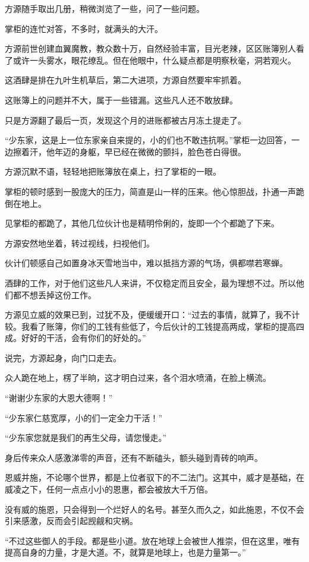 \begin{this_body}
方源随手取出几册，稍微浏览了一些，问了一些问题。

掌柜的连忙对答，不多时，就满头的大汗。

方源前世创建血翼魔教，教众数十万，自然经验丰富，目光老辣，区区账簿别人看了或许一头雾水，眼花缭乱。但在他眼中，什么疑点都是明察秋毫，洞若观火。

这酒肆是排在九叶生机草后，第二大进项，方源自然要牢牢抓着。

这账簿上的问题并不大，属于一些错漏。这些凡人还不敢放肆。

只是方源翻了最后一页，发现这个月的进账都被古月冻土提走了。

“少东家，这是上一位东家亲自来提的，小的们也不敢违抗啊。”掌柜一边回答，一边擦着汗，他年迈的身躯，早已经在微微的颤抖，脸色苍白得很。

方源沉默不语，轻轻地把账簿放在桌上，扫了掌柜的一眼。

掌柜的顿时感到一股庞大的压力，简直是山一样的压来。他心惊胆战，扑通一声跪倒在地上。

见掌柜的都跪了，其他几位伙计也是精明伶俐的，旋即一个个都跪了下来。

方源安然地坐着，转过视线，扫视他们。

伙计们顿感自己如置身冰天雪地当中，难以抵挡方源的气场，俱都噤若寒蝉。

酒肆的工作，对于他们这些凡人来讲，不仅稳定而且安全，最为理想不过。所以他们都不想丢掉这份工作。

方源见立威的效果已到，过犹不及，便缓缓开口：“过去的事情，就算了，我不计较。我看了账簿，你们的工钱有些低了，今后伙计的工钱提高两成，掌柜的提高四成。好好的干活，会有你们的好处的。”

说完，方源起身，向门口走去。

众人跪在地上，楞了半晌，这才明白过来，各个泪水喷涌，在脸上横流。

“谢谢少东家的大恩大德啊！”

“少东家仁慈宽厚，小的们一定全力干活！”

“少东家您就是我们的再生父母，请您慢走。”

身后传来众人感激涕零的声音，还有不断磕头，额头碰到青砖的响声。

恩威并施，不论哪个世界，都是上位者驭下的不二法门。这其中，威才是基础，在威凌之下，任何一点点小小的恩惠，都会被放大千万倍。

没有威的施恩，只会得到一个烂好人的名号。甚至久而久之，如此施恩，不仅不会引来感激，反而会引起觊觎和灾祸。

“不过这些御人的手段。都是些小道。放在地球上会被世人推崇，但在这里，唯有提高自身的力量，才是大道。不，就算是地球上，也是力量第一。”


\end{this_body}
